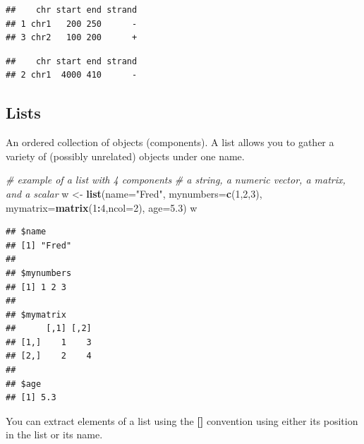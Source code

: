 \documentclass[12pt,]{krantz}
\newenvironment{Shaded}{\begin{snugshade}}{\end{snugshade}}
\newcommand{\CommentTok}[1]{\textcolor[rgb]{0.56,0.35,0.01}{\textit{#1}}}
\newcommand{\DataTypeTok}[1]{\textcolor[rgb]{0.13,0.29,0.53}{#1}}
\newcommand{\DecValTok}[1]{\textcolor[rgb]{0.00,0.00,0.81}{#1}}
\newcommand{\FloatTok}[1]{\textcolor[rgb]{0.00,0.00,0.81}{#1}}
\newcommand{\KeywordTok}[1]{\textcolor[rgb]{0.13,0.29,0.53}{\textbf{#1}}}
\newcommand{\NormalTok}[1]{#1}
\newcommand{\OperatorTok}[1]{\textcolor[rgb]{0.81,0.36,0.00}{\textbf{#1}}}
\newcommand{\StringTok}[1]{\textcolor[rgb]{0.31,0.60,0.02}{#1}}
\theoremstyle{definition}
\theoremstyle{definition}
\theoremstyle{definition}
\theoremstyle{remark}
\begin{document}
\begin{verbatim}
##    chr start end strand
## 1 chr1   200 250      -
## 3 chr2   100 200      +
\end{verbatim}

\begin{Shaded}
\end{Shaded}

\begin{verbatim}
##    chr start end strand
## 2 chr1  4000 410      -
\end{verbatim}

\hypertarget{lists}{%
\subsection{Lists}\label{lists}}

An ordered collection of objects (components). A list allows you to
gather a variety of (possibly unrelated) objects under one name.

\begin{Shaded}
\begin{Highlighting}[]
\CommentTok{# example of a list with 4 components}
\CommentTok{# a string, a numeric vector, a matrix, and a scalar}
\NormalTok{w <-}\StringTok{ }\KeywordTok{list}\NormalTok{(}\DataTypeTok{name=}\StringTok{"Fred"}\NormalTok{,}
       \DataTypeTok{mynumbers=}\KeywordTok{c}\NormalTok{(}\DecValTok{1}\NormalTok{,}\DecValTok{2}\NormalTok{,}\DecValTok{3}\NormalTok{),}
       \DataTypeTok{mymatrix=}\KeywordTok{matrix}\NormalTok{(}\DecValTok{1}\OperatorTok{:}\DecValTok{4}\NormalTok{,}\DataTypeTok{ncol=}\DecValTok{2}\NormalTok{),}
       \DataTypeTok{age=}\FloatTok{5.3}\NormalTok{)}
\NormalTok{w}
\end{Highlighting}
\end{Shaded}

\begin{verbatim}
## $name
## [1] "Fred"
## 
## $mynumbers
## [1] 1 2 3
## 
## $mymatrix
##      [,1] [,2]
## [1,]    1    3
## [2,]    2    4
## 
## $age
## [1] 5.3
\end{verbatim}

You can extract elements of a list using the
\textbf{{[}\protect\hyperlink{section-8}{}{]}} convention using either
its position in the list or its name.
\end{document}
